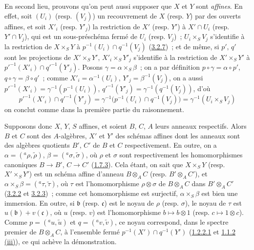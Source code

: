 En second lieu, prouvons qu'on peut aussi supposer que $X$ et $Y$ sont
\emph{affines}. En effet, soit $(U_i)$ (resp. $(V_j)$) un recouvrement de $X$
(resp. $Y$) par des ouverts affines, et soit $X'_i$ (resp. $Y'_j$) la
restriction de $X'$ (resp. $Y'$) à $X'\cap U_i$ (resp. $Y'\cap V_j$), qui est
un sous-préschéma fermé de $U_i$ (resp. $V_j$)~; $U_i\times_S V_j$ s'identifie
à la restriction de $X\times_S Y$ à
$p^{-1}(U_i)\cap q^{-1}(V_j)$ (\hyperref[I.3.2.7-fr]{3.2.7})~; et de même, si
$p'$, $q'$ sont les projections de $X'\times_S Y'$,
$X'_i\times_S Y'_j$ s'identifie à la restriction de $X'\times_S Y'$ à
${p'}^{-1}(X'_i)\cap{q'}^{-1}(Y'_j)$. Posons
$\gamma=\alpha\times_S\beta$~; on a par définition
$p\circ\gamma=\alpha\circ p'$, $q\circ\gamma=\beta\circ q'$~; comme
$X'_i=\alpha^{-1}(U_i)$, $Y'_j=\beta^{-1}(V_j)$, on a aussi
${p'}^{-1}(X'_i)=\gamma^{-1}(p^{-1}(U_i))$,
${q'}^{-1}(Y'_j)=\gamma^{-1}(q^{-1}(V_j))$, d'où
\[
  {p'}^{-1}(X'_i)\cap{q'}^{-1}(Y'_j)
  =\gamma^{-1}\bigl(p^{-1}(U_i)\cap q^{-1}(V_j)\bigr)
  =\gamma^{-1}(U_i\times_S V_j)
\]
on conclut comme dans la première partie du raisonnement.

Supposons donc $X$, $Y$, $S$ affines, et soient $B$, $C$, $A$ leurs anneaux
respectifs. Alors $B$ et $C$ sont des $A$-algèbres, $X'$ et $Y'$ des schémas
affines dont les anneaux sont des algèbres quotients $B'$, $C'$ de $B$ et
$C$ respectivement. En outre, on a
$\alpha=({}^a\rho,\widetilde{\rho})$, $\beta=({}^a\sigma,\widetilde{\sigma})$,
où $\rho$ et $\sigma$ sont respectivement les homomorphismes canoniques
$B\to B'$, $C\to C'$ (\hyperref[I.1.7.3-fr]{1.7.3}). Cela étant, on sait que
$X\times_S Y$ (resp. $X'\times_S Y'$) est un schéma affine d'anneau
$B\otimes_A C$ (resp. $B'\otimes_A C'$), et
$\alpha\times_S\beta=({}^a\tau,\widetilde{\tau})$, où $\tau$ est
l'homomorphisme $\rho\otimes\sigma$ de $B\otimes_A C$ dans
$B'\otimes_A C'$ (\hyperref[I.3.2.2-fr]{3.2.2} et
\hyperref[I.3.2.3-fr]{3.2.3})~; comme cet homomorphisme est surjectif,
$\alpha\times_S\beta$ est bien une immersion. En outre, si $\mathfrak{b}$
(resp. $\mathfrak{c}$) est le noyau de $\rho$ (resp. $\sigma$), le noyau de
$\tau$ est $u(\mathfrak{b})+v(\mathfrak{c})$, où $u$ (resp. $v$) est
l'homomorphisme $b\mapsto b\otimes1$ (resp. $c\mapsto1\otimes c$). Comme
$p=({}^a u,\widetilde{u})$ et $q=({}^a v,\widetilde{v})$, ce noyau correspond,
dans le spectre premier de $B\otimes_A C$, à l'ensemble fermé
$p^{-1}(X')\cap q^{-1}(Y')$ (\hyperref[I.1.2.2.1-fr]{1.2.2.1} et
\hyperref[I.1.1.2-fr]{1.1.2 (iii)}), ce qui achève la démonstration.

